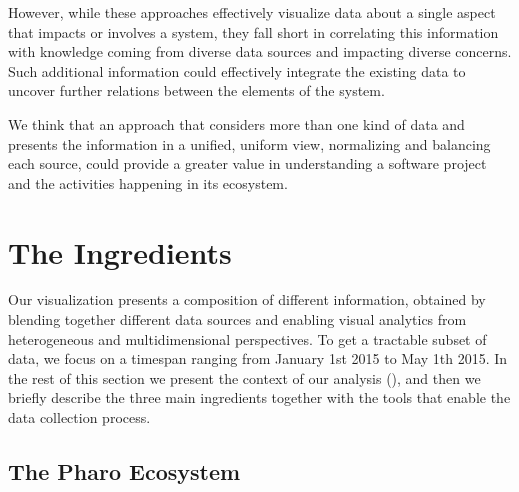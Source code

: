 However, while these approaches effectively visualize data about a single aspect that impacts or involves a system, they fall short in correlating this information with knowledge coming from diverse data sources and impacting diverse concerns. Such additional information could effectively integrate the existing data to uncover further relations between the elements of the system. 

We think that an approach that considers more than one kind of data and presents the information in a unified, uniform view, normalizing and balancing each source, could provide a greater value in understanding a software project and the activities happening in its ecosystem.



\section{The Ingredients}\label{sec:ingredients}



Our visualization presents a composition of different information, obtained by blending together different data sources and enabling visual analytics from heterogeneous and multidimensional perspectives. To get a tractable subset of data, we focus on a timespan ranging from January 1st 2015 to May 1th 2015. In the rest of this section we present the context of our analysis (), and then we briefly describe the three main ingredients together with the tools that enable the data collection process.

\subsection{The Pharo Ecosystem} \label{sec:ingredients:pharo}

